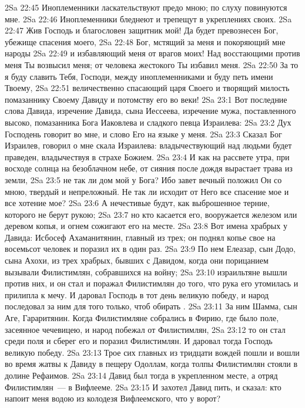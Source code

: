 \vs 2Sa 22:45 Иноплеменники ласкательствуют предо мною; по слуху  повинуются мне.
\vs 2Sa 22:46 Иноплеменники бледнеют и трепещут в укреплениях своих.
\vs 2Sa 22:47 Жив Господь и благословен защитник мой! Да будет превознесен Бог, убежище спасения моего,
\vs 2Sa 22:48 Бог, мстящий за меня и покоряющий мне народы
\vs 2Sa 22:49 и избавляющий меня от врагов моих! Над восстающими против меня Ты возвысил меня; от человека жестокого Ты избавил меня.
\vs 2Sa 22:50 За то я буду славить Тебя, Господи, между иноплеменниками и буду петь имени Твоему,
\vs 2Sa 22:51 величественно спасающий царя Своего и творящий милость помазаннику Своему Давиду и потомству его во веки!
\vs 2Sa 23:1 Вот последние слова Давида, изречение Давида, сына Иессеева, изречение мужа, поставленного высоко, помазанника Бога Иаковлева и сладкого певца Израилева:
\vs 2Sa 23:2 Дух Господень говорит во мне, и слово Его на языке у меня.
\vs 2Sa 23:3 Сказал Бог Израилев, говорил о мне скала Израилева: владычествующий над людьми будет праведен, владычествуя в страхе Божием.
\vs 2Sa 23:4 И как на рассвете утра, при восходе солнца на безоблачном небе, от сияния после дождя вырастает трава из земли,
\vs 2Sa 23:5 не так ли дом мой у Бога? Ибо завет вечный положил Он со мною, твердый и непреложный. Не так ли исходит от Него все спасение мое и все хотение мое?
\vs 2Sa 23:6 А нечестивые будут, как выброшенное терние, которого не берут рукою;
\vs 2Sa 23:7 но кто касается его, вооружается железом или деревом копья, и огнем сожигают его на месте.
\rsbpar\vs 2Sa 23:8 Вот имена храбрых у Давида: Исбосеф Ахаманитянин, главный из трех; он поднял копье свое на восемьсот человек и поразил их в один раз.
\vs 2Sa 23:9 По нем Елеазар, сын Додо, сына Ахохи, из трех храбрых, бывших с Давидом, когда они порицанием вызывали Филистимлян, собравшихся на войну;
\vs 2Sa 23:10 израильтяне вышли против них, и он стал и поражал Филистимлян до того, что рука его утомилась и прилипла к мечу. И даровал Господь в тот день великую победу, и народ последовал за ним для того только, чтоб обирать .
\vs 2Sa 23:11 За ним Шамма, сын Аге, Гараритянин. Когда Филистимляне собрались в Фирию, где было поле, засеянное чечевицею, и народ побежал от Филистимлян,
\vs 2Sa 23:12 то он стал среди поля и сберег его и поразил Филистимлян. И даровал тогда Господь великую победу.
\vs 2Sa 23:13 Трое сих главных из тридцати вождей пошли и вошли во время жатвы к Давиду в пещеру Одоллам, когда толпы Филистимлян стояли в долине Рефаимов.
\vs 2Sa 23:14 Давид был тогда в укрепленном месте, а отряд Филистимлян~--- в Вифлееме.
\vs 2Sa 23:15 И захотел Давид пить, и сказал: кто напоит меня водою из колодезя Вифлеемского, что у ворот?
